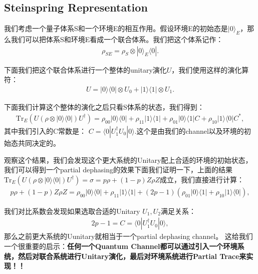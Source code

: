 \subsection{Steinspring Representation}


我们考虑一个量子体系S和一个环境E的相互作用。假设环境E的初始态是$ |0\rangle_E $，那么我们可以把体系S和环境E看成一个联合体系。我们把这个体系记作：
\begin{align}
  \rho_{SE} = \rho_S \otimes |0\rangle_E \langle0|.
\end{align}

下面我们把这个联合体系进行一个整体的unitary演化$ U $，我们使用这样的演化算符：
\begin{align}
  U=|0\rangle\langle0|\otimes U_0+|1\rangle\langle1|\otimes U_1.
\end{align}

下面我们计算这个整体的演化之后只看S体系的状态，我们得到：
\begin{align}
  \mathrm{Tr}_E\left(U(\rho\otimes|0\rangle\langle0|)U^\dagger\right)=\rho_{00}|0\rangle\langle0|+\rho_{11}|1\rangle\langle1|+\rho_{01}|0\rangle\langle1|C+\rho_{10}|1\rangle\langle0|C^*,
\end{align}
其中我们引入的C常数是： $ C=\langle0|U_1^\dagger U_0|0\rangle. $这个是由我们的channel以及环境的初始态共同决定的。

\bigskip
{}

观察这个结果，我们会发现这个更大系统的Unitary配上合适的环境的初始状态，我们可以得到一个partial dephasing的效果下面我们证明一下，上面的结果$ \mathrm{Tr}_E\left(U(\rho\otimes|0\rangle\langle0|)U^\dagger\right) = \sigma=p\rho+(1-p)Z\rho Z $成立，我们直接进行计算：
\begin{align}
  p\rho+(1-p)Z\rho Z=\rho_{00}|0\rangle\langle0|+\rho_{11}|1\rangle\langle1|+(2p-1)(\rho_{01}|0\rangle\langle1|+\rho_{10}|1\rangle\langle0|), 
\end{align}

我们对比系数会发现如果选取合适的Unitary $ U_1, U_2 $满足关系：
\begin{align}
  2 p - 1 = C = \langle0|U_1^\dagger U_0|0\rangle,
\end{align}
那么之前更大系统的Uunitary就相当于一个partial dephasing channel。
这给我们一个很重要的启示：\textbf{任何一个Quantum Channel都可以通过引入一个环境系统，然后对联合系统进行Unitary演化，最后对环境系统进行Partial Trace来实现！！}


\bigskip
{}

